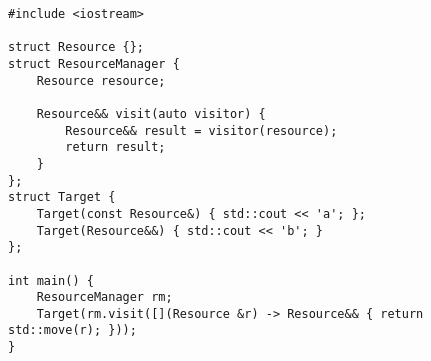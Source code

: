 \begin{lstlisting}[title=\href{https://godbolt.org/z/2a9VNY}{\texttt{godbolt.org/z/2a9VNY}}]
#include <iostream>

struct Resource {};
struct ResourceManager {
    Resource resource;

    Resource&& visit(auto visitor) {
        Resource&& result = visitor(resource);
        return result;
    }
};
struct Target {
    Target(const Resource&) { std::cout << 'a'; };
    Target(Resource&&) { std::cout << 'b'; }
};

int main() {
    ResourceManager rm;
    Target(rm.visit([](Resource &r) -> Resource&& { return std::move(r); }));
}
\end{lstlisting}
